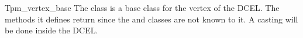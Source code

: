 
\ccRefPageBegin



\begin{ccRefClass}{Tpm_vertex_base}
\label{DCEL_sec:vertex_base}
\ccDefinition The class  is a
base class for the vertex of the DCEL.
The methods it defines 
return  since the  and  classes 
are not known to it. A casting will be done inside the DCEL. 




\ccAccessFunctions
{}
\ccGlue
{}


\ccModifiers
{}

\end{ccRefClass}


